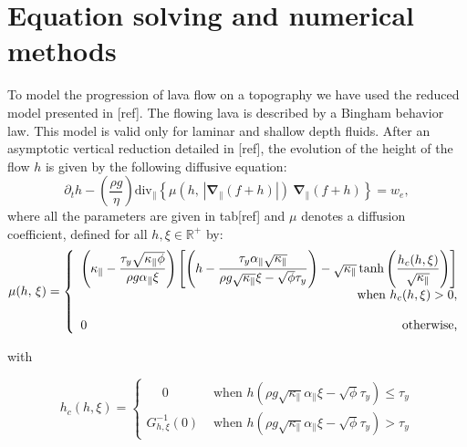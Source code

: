 \documentclass[11pt,a4paper]{article}
\newcommand{\Nabla}{\boldsymbol{\nabla}}
\newcommand{\Frac}[2]{\displaystyle \frac{#1}{#2} }
\begin{document}
\section{Equation solving and numerical methods}
To model the progression of lava flow on a topography we have used the reduced model presented in [ref].  The flowing lava is described by a Bingham behavior law. This model is valid only for laminar and shallow depth fluids. After an asymptotic vertical reduction detailed in [ref], the evolution of the height of the flow $h$
is given by the following diffusive equation:
\begin{equation}
   \partial_t h
   - \left( \Frac{\rho g}{\eta} \right)
   \text{div}_{\parallel}
   \left\{
     \mu\left(h,\,|\Nabla_{\parallel}(f+h)|\right)
     \ \Nabla_{\parallel}(f+h)
   \right\} 
   =
   w_e,
   \label{eq-reduced-h-dimension}
\end{equation}
where all the parameters are given in tab[ref] and $\mu$ denotes a diffusion coefficient, defined for all $h,\xi\in\mathbb{R}^+$ by:
\begin{equation*} 
   \mu(h,\,\xi)
   = 
   \left\{ \begin{array}{lr}
     \left( \kappa_\parallel - \Frac{\tau_y \sqrt{\kappa_\parallel \phi}}{\rho g \alpha_\parallel \xi} \right) 
     & \hspace{-3mm} \left[ \left( h- \Frac{\tau_y \alpha_\parallel \sqrt{\kappa_\parallel}}{\rho g \sqrt{\kappa_\parallel} \xi 
                                      - \sqrt{\phi} \tau_y}  \right) 
     -  \sqrt{\kappa_\parallel} \tanh\left( \Frac{h_c(h,\xi)}{\sqrt{\kappa_\parallel}} \right)\right] 
     \\  & \text{ when } h_c(h,\xi) > 0,
     \\
     &\\
     0 
     & \text{ otherwise,}
   \end{array} \right.
\end{equation*}

with

\begin{equation*} 
   h_c(h,\xi)
  = 
  \begin{cases} 
    \phantom{-}
     0 & \text{ when }  h\left(\rho g \sqrt{\kappa_\parallel} \alpha_\parallel \xi - \sqrt{\phi} \tau_y \right) \leq \tau_y
    \\
     G^{-1}_{h,\xi}(0)
    & \text{ when }  h\left(\rho g \sqrt{\kappa_\parallel} \alpha_\parallel \xi - \sqrt{\phi} \tau_y \right) > \tau_y
  \end{cases}
\end{equation*}
\end{document}
